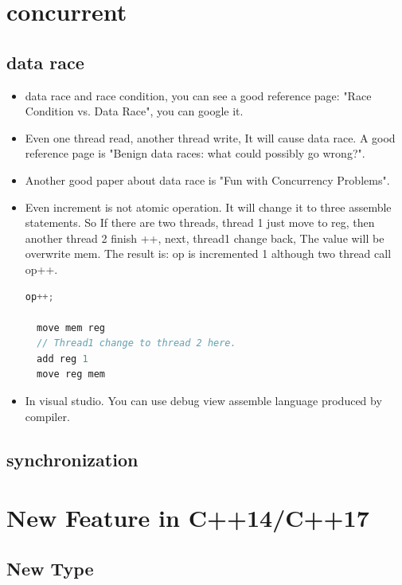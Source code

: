 \documentclass[a4paper,12pt,twoside]{book}
\begin{document}
\section{concurrent}
\subsection{data race}
\begin{itemize}
\item data race and race condition, you can see a good reference page: "Race Condition vs. Data Race", you can google it.

\item Even one thread read, another thread write, It will cause data race. A good reference page is "Benign data races: what could possibly go wrong?". 

\item Another good paper about data race is "Fun with Concurrency Problems".

\item Even increment is not atomic operation. It will change it to three assemble statements. So If there are two threads, thread 1 just move to reg, then another thread 2 finish ++, next, thread1 change back, The value will be overwrite mem. The result is: op is incremented 1 although two thread call op++.
\begin{lstlisting}[frame=single, language=c++]
  op++;
  
  move mem reg
  // Thread1 change to thread 2 here. 
  add reg 1
  move reg mem
\end{lstlisting}

\item In visual studio. You can use debug view assemble language produced by compiler. 
\end{itemize}

\subsection{synchronization}

\section{New Feature in C++14/C++17}

\subsection{New Type}
\end{document}
